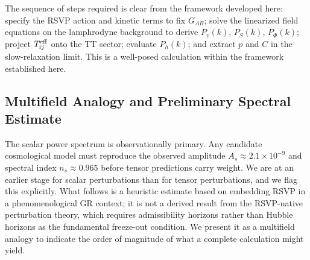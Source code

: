 \documentclass[12pt, a4paper]{article}
\newcommand{\Ph}{P_h}
\newcommand{\Teff}{T^{\rm eff}_{ij}}
\begin{document}
The sequence of steps required is clear from the framework developed here: specify
the RSVP action and kinetic terms to fix $G_{AB}$; solve the linearized field
equations on the lamphrodyne background to derive $P_v(k)$, $P_S(k)$, $P_\Phi(k)$;
project $\Teff$ onto the TT sector; evaluate $\Ph(k)$; and extract $p$ and $C$ in
the slow-relaxation limit. This is a well-posed calculation within the framework
established here.

\subsection{Multifield Analogy and Preliminary Spectral Estimate}
\label{sec:scalar_spectrum}

The scalar power spectrum is observationally primary. Any candidate cosmological
model must reproduce the observed amplitude $A_s \approx 2.1 \times 10^{-9}$ and
spectral index $n_s \approx 0.965$ \citep{Planck2020} before tensor predictions
carry weight. We are at an earlier stage for scalar perturbations than for tensor
perturbations, and we flag this explicitly. What follows is a heuristic estimate
based on embedding RSVP in a phenomenological GR context; it is not a derived
result from the RSVP-native perturbation theory, which requires admissibility
horizons rather than Hubble horizons as the fundamental freeze-out condition. We
present it as a multifield analogy to indicate the order of magnitude of what a
complete calculation might yield.
\end{document}
